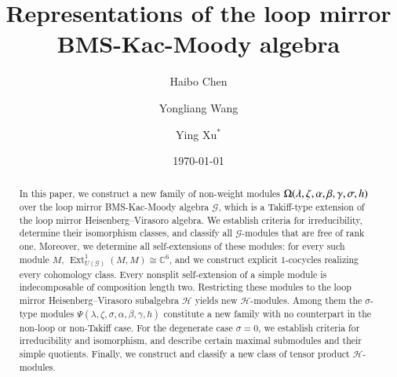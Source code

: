 \documentclass[12pt,reqno]{amsart}
\numberwithin{equation}{section}
\begin{document}
\title[Representations of the Loop mirror BMS-Kac-Moody algebra]{Representations of the loop mirror BMS-Kac-Moody algebra}


\author{Haibo Chen}
\address{School of Science, Jimei University, Xiamen, Fujian 361021, China}


\author{Yongliang Wang}
\address{School of Science, Hefei University of Technology, Hefei, Anhui 230601, China}








\author{Ying Xu$^*$}
\address{School of Science, Hefei University of Technology, Hefei, Anhui 230601, China}


\date{\today}

\vspace{-5mm}


\begin{abstract}
In this paper, we  construct a new family of non-weight modules
$
\Omega(\lambda,\zeta,\alpha,\beta,\gamma,\sigma,\linebreak h)
$ over the loop mirror BMS-Kac-Moody algebra $\mathcal{G}$, which is a
Takiff-type extension of the loop mirror Heisenberg--Virasoro algebra. We establish criteria for  irreducibility, determine their isomorphism classes, and classify all $\mathcal{G}$-modules that are free of rank one. Moreover, we determine all self-extensions of these modules: for every such module $M$, $\operatorname{Ext}^{1}_{U(\mathcal{G})}(M,M)\cong \mathbb{C}^{6}$, and we construct explicit $1$-cocycles realizing every cohomology class. Every nonsplit self-extension of a simple module is indecomposable of composition length two. Restricting these modules to the loop mirror Heisenberg--Virasoro subalgebra $\mathcal{H}$ yields new $\mathcal{H}$-modules. Among them the $\sigma$-type modules $\Psi(\lambda,\zeta,\sigma,\alpha,\beta,\gamma,h)$ constitute a new family with no counterpart in the non-loop or non-Takiff case. For the degenerate case $\sigma=0$, we establish criteria for irreducibility and isomorphism, and describe certain maximal submodules and their simple quotients. Finally, we construct and classify a new class of tensor product $\mathcal{H}$-modules.

\end{abstract}

\end{document}
